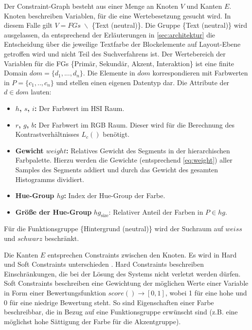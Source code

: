 Der Constraint-Graph besteht aus einer Menge an Knoten $V$ und Kanten $E$. Knoten beschreiben Variablen, für die eine Wertebesetzung gesucht wird. In diesem Falle gilt $V = FGs\; \backslash$ \{Text (neutral)\}. Die Gruppe \{Text (neutral)\} wird ausgelassen, da entsprechend der Erläuterungen in \autoref{sec:architektur} die Entscheidung über die jeweilige Textfarbe der Blockelemente auf Layout-Ebene  getroffen wird und nicht Teil des Suchverfahrens ist. Der Wertebereich der Variablen für die FGs \{Primär, Sekundär, Akzent, Interaktion\} ist eine finite Domain $dom = \{d_1, ..., d_{n}\}$. Die Elemente in $dom$ korrespondieren mit Farbwerten in $P = \{c_1, .., c_n\}$ und stellen einen eigenen Datentyp dar. Die Attribute der $d \in dom$ lauten:

\pagebreak

\begin{itemize}
	\item \textbf{$h$, $s$, $i$:} Der Farbwert im HSI Raum.
	\item \textbf{$r$, $g$, $b$:} Der Farbwert im RGB Raum. Dieser wird für die Berechnung des Kontrastverhältnisses $L_c()$ benötigt.
	\item \textbf{Gewicht $weight$:} Relatives Gewicht des Segments in der hierarchischen Farbpalette. Hierzu werden die Gewichte (entsprechend \autoref{eq:weight}) aller Samples des Segments addiert und durch das Gewicht des gesamten Histogramms dividiert.
	\item \textbf{Hue-Group $hg$:} Index der Hue-Group der Farbe.
	\item \textbf{Größe der Hue-Group} $hg_\text{size}$: Relativer Anteil der Farben in $P \in hg$.
\end{itemize}

Für die Funktionsgruppe \{Hintergrund (neutral)\} wird der Suchraum auf $weiss$ und $schwarz$ beschränkt.

Die Kanten $E$ entsprechen Constraints zwischen den Knoten. Es wird in Hard und Soft Constraints unterschieden \citep{patterns}. Hard Constraints beschreiben Einschränkungen, die bei der Lösung des Systems nicht verletzt werden dürfen. Soft Constraints beschreiben eine Gewichtung der möglichen Werte einer Variable in Form einer Bewertungsfunktion $score() \to [0, 1]$, wobei 1 für eine hohe und 0 für eine niedrige Bewertung steht. So sind Eigenschaften einer Farbe beschreibbar, die in Bezug auf eine Funktionsgruppe erwünscht sind (z.B. eine möglichst hohe Sättigung der Farbe für die Akzentgruppe).

